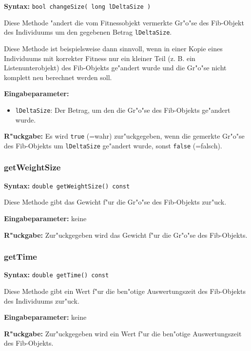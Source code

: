 \textbf{Syntax:} \verb|bool changeSize( long lDeltaSize )|

\bigskip\noindent
Diese Methode "andert die vom Fitnessobjekt vermerkte Gr"o"se des Fib-Objekt des Individuums um den gegebenen Betrag \verb|lDeltaSize|.

Diese Methode ist beispielsweise dann sinnvoll, wenn in einer Kopie eines Individuums mit korrekter Fitness nur ein kleiner Teil (z. B. ein Listenunterobjekt) des Fib-Objekts ge"andert wurde und die Gr"o"se nicht komplett neu berechnet werden soll.

\bigskip\noindent
\textbf{Eingabeparameter:}
\begin{itemize}
 \item \verb|lDeltaSize|: Der Betrag, um den die Gr"o"se des Fib-Objekts ge"andert wurde.
\end{itemize}

\bigskip\noindent
\textbf{R"uckgabe:} Es wird \verb|true| (=wahr) zur"uckgegeben, wenn die gemerkte Gr"o"se des Fib-Objekts um \verb|lDeltaSize| ge"andert wurde, sonst \verb|false| (=falsch).


\subsubsection{getWeightSize}

\textbf{Syntax:} \verb|double getWeightSize() const|

\bigskip\noindent
Diese Methode gibt das Gewicht f"ur die Gr"o"se des Fib-Objekts zur"uck.

\bigskip\noindent
\textbf{Eingabeparameter:} keine

\bigskip\noindent
\textbf{R"uckgabe:} Zur"uckgegeben wird das Gewicht f"ur die Gr"o"se des Fib-Objekts.


\subsubsection{getTime}

\textbf{Syntax:} \verb|double getTime() const|

\bigskip\noindent
Diese Methode gibt ein Wert f"ur die ben"otige Auswertungszeit des Fib-Objekts des Individuums zur"uck.

\bigskip\noindent
\textbf{Eingabeparameter:} keine

\bigskip\noindent
\textbf{R"uckgabe:} Zur"uckgegeben wird ein Wert f"ur die ben"otige Auswertungszeit des Fib-Objekts.



